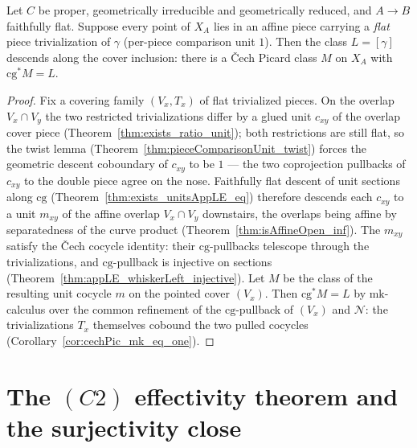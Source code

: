 \begin{theorem}
  \label{thm:refinement_splice}
  \leanok
  Let \(C\) be proper, geometrically irreducible and geometrically reduced, and \(A \to B\)
  faithfully flat. Suppose every point of \(X_A\) lies in an affine piece carrying a \emph{flat}
  piece trivialization of \(\gamma\) (per-piece comparison unit \(1\)). Then the class \(L =
  [\gamma]\) descends along the cover inclusion: there is a \v Cech Picard class \(M\) on \(X_A\)
  with \(\mathrm{cg}^{*}M = L\).
\end{theorem}
\begin{proof}
  \leanok
  Fix a covering family \((V_x, T_x)\) of flat trivialized pieces. On the overlap \(V_x \cap V_y\)
  the two restricted trivializations differ by a glued unit \(c_{xy}\) of the overlap cover piece
  (Theorem~\ref{thm:exists_ratio_unit}); both restrictions are still flat, so the twist lemma
  (Theorem~\ref{thm:pieceComparisonUnit_twist}) forces the geometric descent coboundary of
  \(c_{xy}\) to be \(1\) --- the two coprojection pullbacks of \(c_{xy}\) to the double piece agree
  on the nose. Faithfully flat descent of unit sections along \(\mathrm{cg}\)
  (Theorem~\ref{thm:exists_unitsAppLE_eq}) therefore descends each \(c_{xy}\) to a unit \(m_{xy}\) of
  the affine overlap \(V_x \cap V_y\) downstairs, the overlaps being affine by separatedness of the
  curve product (Theorem~\ref{thm:isAffineOpen_inf}). The \(m_{xy}\) satisfy the \v Cech cocycle
  identity: their \(\mathrm{cg}\)-pullbacks telescope through the trivializations, and
  \(\mathrm{cg}\)-pullback is injective on sections (Theorem~\ref{thm:appLE_whiskerLeft_injective}).
  Let \(M\) be the class of the resulting unit cocycle \(m\) on the pointed cover \((V_x)\). Then
  \(\mathrm{cg}^{*}M = L\) by \(\mathrm{mk}\)-calculus over the common refinement of the
  \(\mathrm{cg}\)-pullback of \((V_x)\) and \(\mathcal N\): the trivializations \(T_x\) themselves
  cobound the two pulled cocycles (Corollary~\ref{cor:cechPic_mk_eq_one}).
\end{proof}

\section{The \((C2)\) effectivity theorem and the surjectivity close}
\label{sec:effectivityClose}


